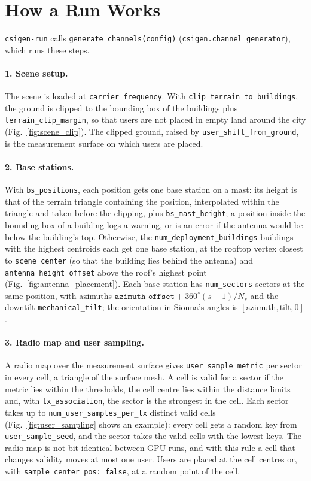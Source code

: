 \documentclass{article}
\newcommand{\key}[1]{\texttt{#1}}
\begin{document}
\clearpage
\section{How a Run Works}
\label{sec:pipeline}
\texttt{csigen-run} calls \texttt{generate\_channels(config)} (\texttt{csigen.channel\_generator}), which runs these steps.

\paragraph{1. Scene setup.} The scene is loaded at \key{carrier\_frequency}. With \key{clip\_terrain\_to\_buildings}, the ground is clipped to the bounding box of the buildings plus \key{terrain\_clip\_margin}, so that users are not placed in empty land around the city (Fig.~\ref{fig:scene_clip}). The clipped ground, raised by \key{user\_shift\_from\_ground}, is the measurement surface on which users are placed.

\paragraph{2. Base stations.} With \key{bs\_positions}, each position gets one base station on a mast: its height is that of the terrain triangle containing the position, interpolated within the triangle and taken before the clipping, plus \key{bs\_mast\_height}; a position inside the bounding box of a building logs a warning, or is an error if the antenna would be below the building's top. Otherwise, the \key{num\_deployment\_buildings} buildings with the highest centroids each get one base station, at the rooftop vertex closest to \key{scene\_center} (so that the building lies behind the antenna) and \key{antenna\_height\_offset} above the roof's highest point (Fig.~\ref{fig:antenna_placement}). Each base station has \key{num\_sectors} sectors at the same position, with azimuths $\key{azimuth\_offset} + 360^\circ (s-1)/N_s$ and the downtilt \key{mechanical\_tilt}; the orientation in Sionna's angles is $[\textrm{azimuth}, \textrm{tilt}, 0]$.

\paragraph{3. Radio map and user sampling.} A radio map over the measurement surface gives \key{user\_sample\_metric} per sector in every cell, a triangle of the surface mesh. A cell is valid for a sector if the metric lies within the thresholds, the cell centre lies within the distance limits and, with \key{tx\_association}, the sector is the strongest in the cell. Each sector takes up to \key{num\_user\_samples\_per\_tx} distinct valid cells (Fig.~\ref{fig:user_sampling} shows an example): every cell gets a random key from \key{user\_sample\_seed}, and the sector takes the valid cells with the lowest keys. The radio map is not bit-identical between GPU runs, and with this rule a cell that changes validity moves at most one user. Users are placed at the cell centres or, with \key{sample\_center\_pos: false}, at a random point of the cell.
\end{document}

